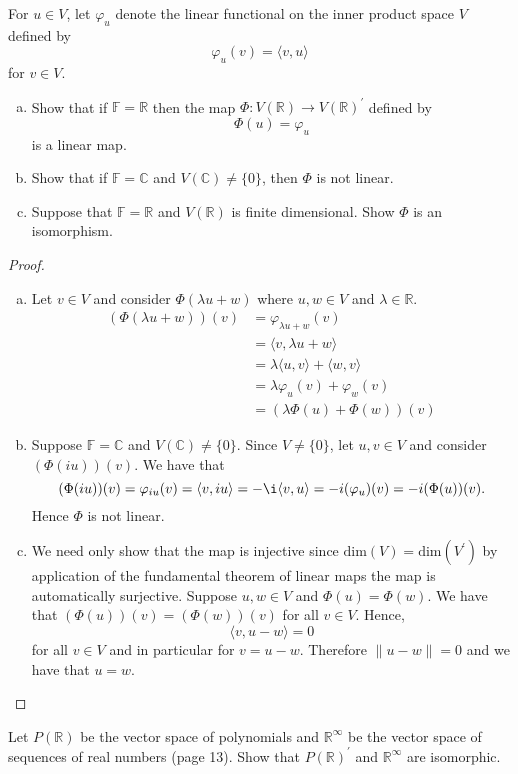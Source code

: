\documentclass[11pt]{exam}
\theoremstyle{definition}
\begin{document}
\begin{questions}
\question For $u\in V$, let $\varphi_u$ denote the linear functional on the inner product space $V$ defined by 
\[\varphi_u(v)=\langle v,u\rangle\] 
for $v\in V$. 
\begin{enumerate}[(a)]
\item Show that if $\mathbb{F}=\mathbb{R}$ then the map $\Phi: V(\mathbb{R})\rightarrow V(\mathbb{R})^\prime$ defined by 
\[\Phi(u)=\varphi_u\]
is a linear map. 
\item Show that if $\mathbb{F}=\mathbb{C}$ and $V(\mathbb{C})\neq \{0\}$, then $\Phi$ is not linear. 
\item Suppose that $\mathbb{F}=\mathbb{R}$ and $V(\mathbb{R})$ is finite dimensional. Show $\Phi$ is an isomorphism. 
\end{enumerate}
\begin{proof}\ \\
\begin{enumerate}[(a)] 
\item Let $v\in V$ and consider $\Phi(\lambda u+w)$ where $u, w\in V$ and $\lambda\in \mathbb{R}$. 
\begin{align*}(\Phi(\lambda u+w))(v)&=\varphi_{\lambda u+w}(v)\\
&=\langle v, \lambda u+w\rangle\\
&=\lambda \langle u,v\rangle +\langle w,v\rangle\\
&=\lambda \varphi_u(v)+\varphi_w(v)\\
&=(\lambda \Phi(u)+\Phi(w))(v)
\end{align*}
\item Suppose $\mathbb{F}=\mathbb{C}$ and $V(\mathbb{C})\neq \{0\}$. Since $V\neq \{0\}$, let $u,v\in V$ and consider $(\Phi(iu))(v)$. We have that 
\[(\Phi(iu))(v)=\varphi_{iu}(v)=\langle v, iu\rangle=-\i\langle v,u\rangle=-i(\varphi_u)(v)=-i(\Phi(u))(v).\]
Hence $\Phi$ is not linear. 
\item We need only show that the map is injective since $\text{dim}(V)=\text{dim}(V^\prime)$ by application of the fundamental theorem of linear maps the map is automatically surjective. Suppose $u,w\in V$ and $\Phi(u)=\Phi(w)$. We have that 
$(\Phi(u))(v)=(\Phi(w))(v)$ for all $v\in V$. Hence, 
\[\langle v,u-w\rangle=0\] for all $v\in V$ and in particular for $v=u-w$. Therefore $\|u-w\|=0$ and we have that $u=w$. 
\end{enumerate}
\end{proof}
\question Let $P(\mathbb{R})$ be the vector space of polynomials and $\mathbb{R}^\infty$ be the vector space of sequences of real numbers (page 13). Show that $P(\mathbb{R})^\prime$ and $\mathbb{R}^\infty$ are isomorphic. \vspace{-.1in}\\


\end{questions}
\end{document}
